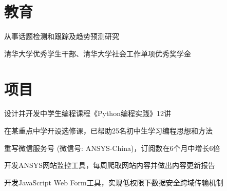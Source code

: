 \documentclass[a4paper]{rukh-cv-zh}
\begin{document}
\begin{minipage}[t]{0.74\textwidth} %


\section{教育}

\vspace{\topsep}
\begin{tightitemize}
\item 从事话题检测和跟踪及趋势预测研究
\end{tightitemize}

\sectionspace


\begin{tightitemize}
\item 清华大学优秀学生干部、清华大学社会工作单项优秀奖学金
\end{tightitemize}

\sectionspace


\section{项目}

\begin{tightitemize}
\item 设计并开发中学生编程课程《Python编程实践》12讲 
\item 在某重点中学开设选修课，已帮助25名初中生学习编程思想和方法
\end{tightitemize}

\sectionspace


\begin{tightitemize}
\item 重写微信服务号 (微信号: ANSYS-China)，订阅数在6个月中增长6倍
\item 开发ANSYS网站监控工具，每周爬取网站内容并做出内容更新报告
\item 开发JavaScript Web Form工具，实现低权限下数据安全跨域传输机制
\end{tightitemize}


\end{minipage}
\end{document}
